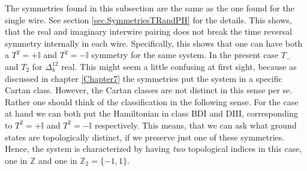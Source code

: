 The symmetries found in this subsection are the same as the one found for the single wire. See section \ref{sec.SymmetriesTRandPH} for the details. This shows, that the real and imaginary interwire pairing does not break the time reversal symmetry internally in each wire. Specifically, this shows that one can have both a $T^2 = +\mathbb{I}$ and $T^2 = -\mathbb{I}$ symmetry for the same system. In the present case $T_-$ and $T_2$ for $\Delta^{12}_k$ real. This might seem a little confusing at first sight, because as discussed in chapter \ref{Chapter7} the symmetries put the system in a specific Cartan class. However, the Cartan classes are not distinct in this sense per se. Rather one should think of the classification in the following sense. For the case at hand we can both put the Hamiltonian in class BDI and DIII, corresponding to $T^2 = +\mathbb{I}$ and $T^2=-\mathbb{I}$ respectively. This means, that we can ask what ground states are topologically distinct, if we preserve just one of these symmetries. Hence, the system is characterized by having \textit{two} topological indices in this case, one in $\mathbb{Z}$ and one in $\mathbb{Z}_2 = \{-1,1\}$.


